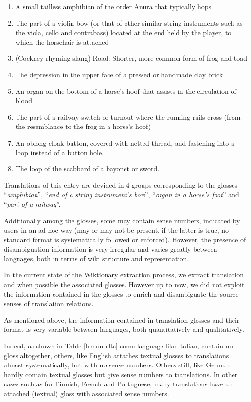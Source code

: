 \documentclass[10pt, a4paper]{article}
\begin{document}
\begin{small}\begin{enumerate}
\item A small tailless amphibian of the order Anura that typically hops
\item The part of a violin bow (or that of other similar string instruments such as the viola, cello and contrabass) located at the end held by the player, to which the horsehair is attached
\item (Cockney rhyming slang) Road. Shorter, more common form of frog and toad
\item The depression in the upper face of a pressed or handmade clay brick
\item An organ on the bottom of a horse’s hoof that assists in the circulation of blood
\item The part of a railway switch or turnout where the running-rails cross (from the resemblance to the frog in a horse’s hoof)
\item An oblong cloak button, covered with netted thread, and fastening into a loop instead of a button hole.
\item The loop of the scabbard of a bayonet or sword. 
\end{enumerate}\end{small}

Translations of this entry are devided in 4 groups corresponding to the glosses ``\emph{amphibian}'', ``\emph{end of a string instrument’s bow}'', ``\emph{organ in a horse’s foot}'' and ``\emph{part of a railway}''. 

Additionally among the glosses, some may contain sense numbers, indicated by users in an ad-hoc way (may or may not be present, if the latter is true, no standard format is systematically followed or enforced). However, the presence of disambiguation information is very irregular and varies greatly between languages, both in terms of wiki structure and representation.

In the current state of the Wiktionary extraction process, we extract translation and when possible the associated glosses. However up to now, we did not exploit the information contained in the glosses to enrich and disambiguate the source senses of translation relations.

As mentioned above, the information contained in translation glosses and their format is very variable between languages, both quantitatively and qualitatively. 

Indeed, as shown in Table \ref{lemon-elts} some language like Italian, contain no gloss altogether, others, like English attaches textual glosses to translations almost systematically, but with no sense numbers. Others still, like German hardly contain textual glosses but give sense numbers to translations. In other cases such as for Finnish, French and Portuguese, many translations have an attached (textual) gloss with associated sense numbers. 
\end{document}
